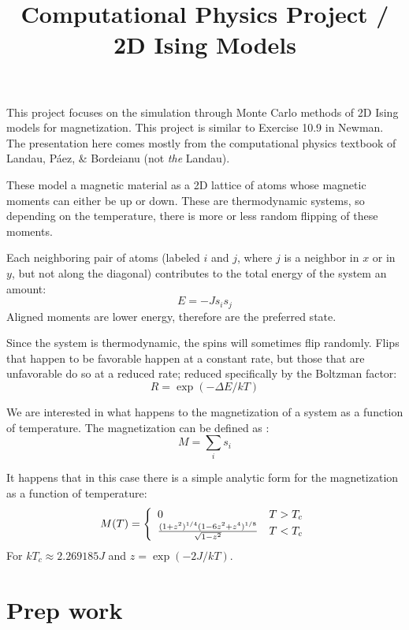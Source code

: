 \documentclass[11pt, preprint]{aastex}
\begin{document}
\title{\bf Computational Physics Project / 2D Ising Models}

This project focuses on the simulation through Monte Carlo methods of
2D Ising models for magnetization. This project is similar to Exercise
10.9 in Newman.  The presentation here comes mostly from the
computational physics textbook of Landau, P{\'a}ez, \& Bordeianu (not
{\it the} Landau).

These model a magnetic material as a 2D lattice of atoms whose
magnetic moments can either be up or down. These are thermodynamic
systems, so depending on the temperature, there is more or less random
flipping of these moments.

Each neighboring pair of atoms (labeled $i$ and $j$, where $j$ is a
neighbor in $x$ or in $y$, but not along the diagonal) contributes to
the total energy of the system an amount:
\begin{equation}
  E = - J s_{i} s_{j}
\end{equation}
Aligned moments are lower energy, therefore are the preferred state.

Since the system is thermodynamic, the spins will sometimes flip
randomly. Flips that happen to be favorable happen at a constant rate,
but those that are unfavorable do so at a reduced rate; reduced
specifically by the Boltzman factor:
\begin{equation}
  R = \exp\left(-\Delta E /k T\right)
\end{equation}

We are interested in what happens to the magnetization of a system as
a function of temperature.  The magnetization can be defined as :
\begin{equation}
M = \sum_i s_i
\end{equation}

It happens that in this case there is a simple analytic form for the
magnetization as a function of temperature:
\begin{equation}
  M(T) = \left\{
  \begin{array}{ll}
  0 & T > T_c \cr
  \frac{(1+z^2)^{1/4} (1-6 z^2 +z^4)^{1/8}}{\sqrt{1-z^2}} & T < T_c
    \end{array}\right. 
\end{equation}
For $kT_c \approx 2.269185 J$ and $z=\exp(-2J/kT)$.

\section{Prep work}
\end{document}
